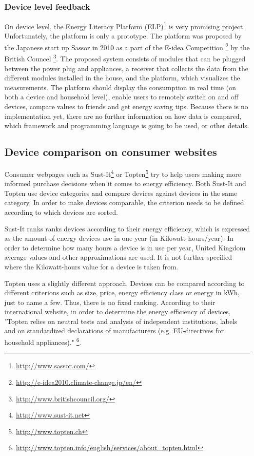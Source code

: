 \subsubsection{Device level feedback}  
On device level, the Energy Literacy Platform  (ELP)\footnote{\url{http://www.sassor.com/}} is very promising project. Unfortunately, the platform is only a prototype. The platform was proposed by the Japanese start up Sassor in 2010 as a part of the E-idea Competition \footnote{\url{http://e-idea2010.climate-change.jp/en/}} by the British Councel \footnote{\url{http://www.britishcouncil.org/}}.
The proposed system consists of modules that can be plugged between the power plug and appliances, a receiver that collects the data from the different modules installed in the house, and the platform, which visualizes the measurements. The platform should display the consumption in real time (on both a device and household level), enable users to remotely switch on and off devices, compare values to friends and get energy saving tips.
Because there is no implementation yet, there are no further information on how data is compared, which framework and programming language is going to be used, or other details. 

\subsection*{Device comparison on consumer websites}
Consumer webpages such as Sust-It\footnote{\url{http://www.sust-it.net}} or Topten\footnote{\url{http://www.topten.ch}} try to help users making more informed purchase decisions when it comes to energy efficiency. Both Sust-It and Topten use device categories and compare devices against devices in the same category. In order to make devices comparable, the criterion needs to be defined according to which devices are sorted. 

Sust-It ranks ranks devices according to their energy efficiency, which is expressed as the amount of energy devices use in one year (in Kilowatt-hours/year). In order to determine how many hours a device is in use per year, United Kingdom average values and other approximations are used. It is not further specified where the Kilowatt-hours value for a device is taken from.   

Topten uses a slightly different approach. Devices can be compared according to different criterions such as size, price, energy efficiency class or energy in kWh, just to name a few. Thus, there is no fixed ranking. According to their international website, in order to determine the energy efficiency of devices, "Topten relies on neutral tests and analysis of independent institutions, labels and on standardized declarations of manufacturers (e.g. EU-directives for household appliances)." \footnote{\url{http://www.topten.info/english/services/about_topten.html}}.